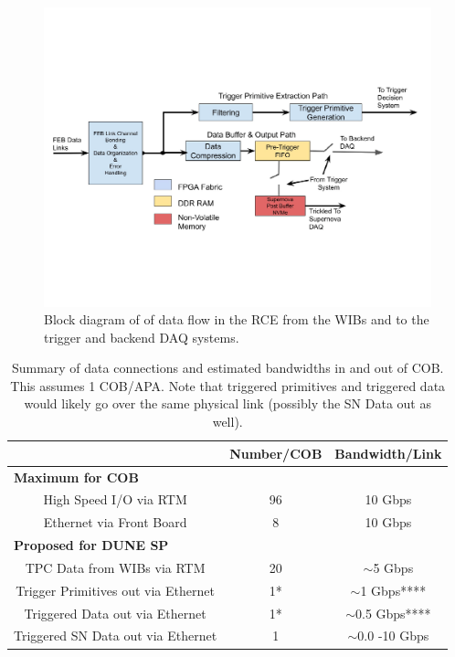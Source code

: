 \begin{figure}[tb]
\centering
\includegraphics[width=1.0\textwidth]{images/base_rce_dune_dataflow.pdf}
\caption{\label{fig:base}Block diagram of of data flow in the RCE from the WIBs and to the trigger and backend DAQ systems. }
\end{figure}



\begin{table}[htp]
\begin{center}
\begin{tabular}{|c|c|c|}
\hline
     & Number/COB           &     Bandwidth/Link \\
     \hline
\multicolumn{3}{|l|}{\bf{Maximum for COB}} \\
\hline
High Speed I/O via RTM & 96 & 10 Gbps \\
Ethernet via Front Board & 8  & 10 Gbps \\
\hline
\multicolumn{3}{|l|}{\bf{Proposed for DUNE SP}} \\
\hline
TPC Data from WIBs via RTM & 20 & $\sim$5 Gbps\\
Trigger Primitives out via Ethernet  &  1*  &  $\sim$1 Gbps**** \\
Triggered Data out via Ethernet  &  1* &  $\sim$0.5 Gbps**** \\
Triggered SN Data out via Ethernet  & 1   &  $\sim$0.0 -10 Gbps\\
\hline
\end{tabular}
\end{center}
\caption{Summary of data connections and estimated bandwidths in and out of COB. This assumes 1 COB/APA.  Note that triggered primitives and triggered data would likely go over the same physical link (possibly the SN Data out as well).  }
\label{tab:hsIO}
\end{table}%

